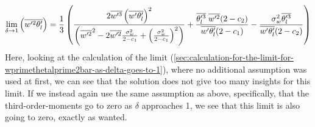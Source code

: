\begin{align}
    \label{eq:limit_wprimethetalprime2bar_delta_to_1}
    \lim_{\delta \to 1}\left(\overline{w'^2 \theta_l'}\right)
    = \frac{1}{3}
    \left(
    \frac{
        2 \overline{w'^3} \left(\overline{w' \theta_l'} \right)^2
    }
    {
        \left(\overline{w'^2}^2 - 2 \overline{w'^2} \frac{\sigma_w^2}{2 - c_1} + \left(\frac{\sigma_w^2}{2 - c_1}\right)^2 \right)
    }
    +
    \frac{\overline{\theta_l'^3} \; \overline{w'^2}(2 - c_2)}{\overline{w' \theta_l'}(2 - c_1)}
    -
    \frac{\sigma_w^2 \overline{\theta_l'^3}}{\overline{w' \theta_l'} (2 - c_2)}
    \right)
\end{align}
Here, looking at the calculation of the limit
(\cref{sec:calculation-for-the-limit-for-wprimethetalprime2bar-as-delta-goes-to-1}),
where no additional assumption was used at first,
we can see that the solution does not give too many insights for this limit.
If we instead again use the same assumption as above,
specifically, that the third-order-moments go to zero as $\delta$ approaches 1,
we see that this limit is also going to zero, exactly as wanted.

